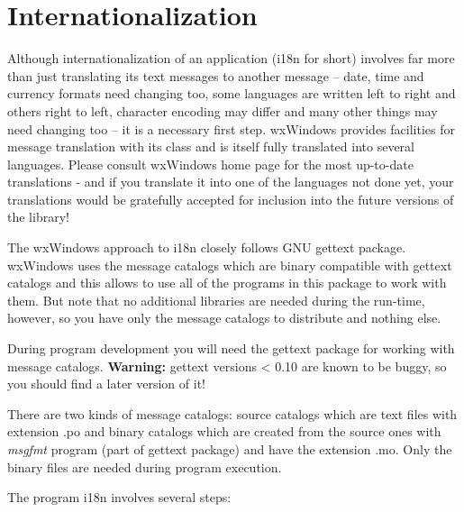 \section{Internationalization}\label{internationalization}

Although internationalization of an application (i18n for short) involves far
more than just translating its text messages to another message -- date, time and
currency formats need changing too, some languages are written left to right
and others right to left, character encoding may differ and many other things
may need changing too -- it is a necessary first step. wxWindows provides
facilities for message translation with its 
 class and is itself fully translated into several
languages. Please consult wxWindows home page for the most up-to-date
translations - and if you translate it into one of the languages not done
yet, your translations would be gratefully accepted for inclusion into the
future versions of the library!

The wxWindows approach to i18n closely follows GNU gettext package. wxWindows uses the
message catalogs which are binary compatible with gettext catalogs and this
allows to use all of the programs in this package to work with them. But note
that no additional libraries are needed during the run-time, however, so you
have only the message catalogs to distribute and nothing else.

During program development you will need the gettext package for
working with message catalogs. {\bf Warning:} gettext versions < 0.10 are known
to be buggy, so you should find a later version of it!

There are two kinds of message catalogs: source catalogs which are text files
with extension .po and binary catalogs which are created from the source ones
with {\it msgfmt} program (part of gettext package) and have the extension .mo.
Only the binary files are needed during program execution.

The program i18n involves several steps:

